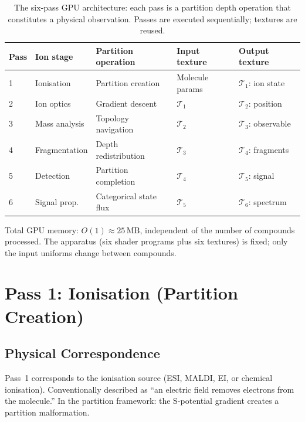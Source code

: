 \begin{table}[htbp]
\centering
\caption{The six-pass GPU architecture: each pass is a partition depth
  operation that constitutes a physical observation.  Passes are executed
  sequentially; textures are reused.}
\label{tab:ch22-sixpass}
\begin{tabular}{@{}lllll@{}}
\toprule
\textbf{Pass} & \textbf{Ion stage} & \textbf{Partition operation}
  & \textbf{Input texture} & \textbf{Output texture} \\
\midrule
1 & Ionisation      & Partition creation     & Molecule params & $\mathcal{T}_1$: ion state \\
2 & Ion optics      & Gradient descent       & $\mathcal{T}_1$ & $\mathcal{T}_2$: position \\
3 & Mass analysis   & Topology navigation    & $\mathcal{T}_2$ & $\mathcal{T}_3$: observable \\
4 & Fragmentation   & Depth redistribution   & $\mathcal{T}_3$ & $\mathcal{T}_4$: fragments \\
5 & Detection       & Partition completion   & $\mathcal{T}_4$ & $\mathcal{T}_5$: signal \\
6 & Signal prop.    & Categorical state flux & $\mathcal{T}_5$ & $\mathcal{T}_6$: spectrum \\
\bottomrule
\end{tabular}
\end{table}

Total GPU memory: $O(1) \approx 25\,\mathrm{MB}$, independent of the number
of compounds processed.  The apparatus (six shader programs plus six textures)
is fixed; only the input uniforms change between compounds.

\section{Pass 1: Ionisation (Partition Creation)}
\label{sec:ch22-pass1}

\subsection{Physical Correspondence}

Pass~1 corresponds to the ionisation source (ESI, MALDI, EI, or chemical
ionisation).  Conventionally described as ``an electric field removes electrons
from the molecule.''  In the partition framework: the S-potential gradient
creates a partition malformation.

